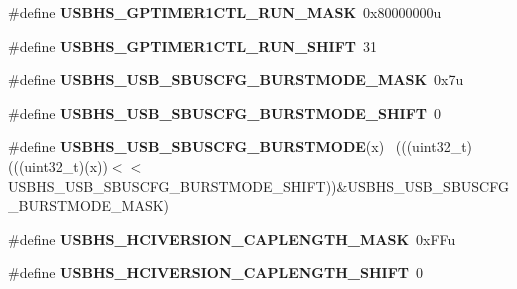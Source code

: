 \begin{DoxyCompactItemize}
\item 
\hypertarget{group___u_s_b_h_s___register___masks_gad00a867b8e0264c30353d11f8c60ee78}{}\#define {\bfseries U\+S\+B\+H\+S\+\_\+\+G\+P\+T\+I\+M\+E\+R1\+C\+T\+L\+\_\+\+R\+U\+N\+\_\+\+M\+A\+S\+K}~0x80000000u\label{group___u_s_b_h_s___register___masks_gad00a867b8e0264c30353d11f8c60ee78}

\item 
\hypertarget{group___u_s_b_h_s___register___masks_gae9e1212ca5e00f51f62a4f93012b2a12}{}\#define {\bfseries U\+S\+B\+H\+S\+\_\+\+G\+P\+T\+I\+M\+E\+R1\+C\+T\+L\+\_\+\+R\+U\+N\+\_\+\+S\+H\+I\+F\+T}~31\label{group___u_s_b_h_s___register___masks_gae9e1212ca5e00f51f62a4f93012b2a12}

\item 
\hypertarget{group___u_s_b_h_s___register___masks_ga8d987387e87dd26fd832d4036dd54e32}{}\#define {\bfseries U\+S\+B\+H\+S\+\_\+\+U\+S\+B\+\_\+\+S\+B\+U\+S\+C\+F\+G\+\_\+\+B\+U\+R\+S\+T\+M\+O\+D\+E\+\_\+\+M\+A\+S\+K}~0x7u\label{group___u_s_b_h_s___register___masks_ga8d987387e87dd26fd832d4036dd54e32}

\item 
\hypertarget{group___u_s_b_h_s___register___masks_gab8f2393ce24562efff850b2c98068bd0}{}\#define {\bfseries U\+S\+B\+H\+S\+\_\+\+U\+S\+B\+\_\+\+S\+B\+U\+S\+C\+F\+G\+\_\+\+B\+U\+R\+S\+T\+M\+O\+D\+E\+\_\+\+S\+H\+I\+F\+T}~0\label{group___u_s_b_h_s___register___masks_gab8f2393ce24562efff850b2c98068bd0}

\item 
\hypertarget{group___u_s_b_h_s___register___masks_ga7ca477e1c8cd7df30675d5ffae4b8f39}{}\#define {\bfseries U\+S\+B\+H\+S\+\_\+\+U\+S\+B\+\_\+\+S\+B\+U\+S\+C\+F\+G\+\_\+\+B\+U\+R\+S\+T\+M\+O\+D\+E}(x)                  ~(((uint32\+\_\+t)(((uint32\+\_\+t)(x))$<$$<$U\+S\+B\+H\+S\+\_\+\+U\+S\+B\+\_\+\+S\+B\+U\+S\+C\+F\+G\+\_\+\+B\+U\+R\+S\+T\+M\+O\+D\+E\+\_\+\+S\+H\+I\+F\+T))\&U\+S\+B\+H\+S\+\_\+\+U\+S\+B\+\_\+\+S\+B\+U\+S\+C\+F\+G\+\_\+\+B\+U\+R\+S\+T\+M\+O\+D\+E\+\_\+\+M\+A\+S\+K)\label{group___u_s_b_h_s___register___masks_ga7ca477e1c8cd7df30675d5ffae4b8f39}

\item 
\hypertarget{group___u_s_b_h_s___register___masks_ga9335f1facfbbb6a101e07f7fa7a9da1d}{}\#define {\bfseries U\+S\+B\+H\+S\+\_\+\+H\+C\+I\+V\+E\+R\+S\+I\+O\+N\+\_\+\+C\+A\+P\+L\+E\+N\+G\+T\+H\+\_\+\+M\+A\+S\+K}~0x\+F\+Fu\label{group___u_s_b_h_s___register___masks_ga9335f1facfbbb6a101e07f7fa7a9da1d}

\item 
\hypertarget{group___u_s_b_h_s___register___masks_gae596bc2223a27853b2def943932588f3}{}\#define {\bfseries U\+S\+B\+H\+S\+\_\+\+H\+C\+I\+V\+E\+R\+S\+I\+O\+N\+\_\+\+C\+A\+P\+L\+E\+N\+G\+T\+H\+\_\+\+S\+H\+I\+F\+T}~0\label{group___u_s_b_h_s___register___masks_gae596bc2223a27853b2def943932588f3}


\end{DoxyCompactItemize}
